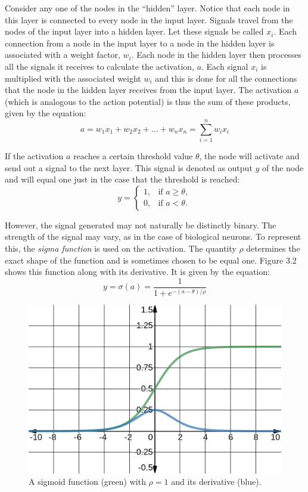 \documentclass[a4paper, 12pt]{report}
\theoremstyle{definition}
\begin{document}
Consider any one of the nodes in the \enquote{hidden} layer. Notice that each node in this layer is connected to every node in the input layer. Signals travel from the nodes of the input layer into a hidden layer. Let these signals be called $x_i$. Each connection from a node in the input layer to a node in the hidden layer is associated with a weight factor, $w_i$. Each node in the hidden layer then processes all the signals it receives to calculate the activation, $a$. Each signal $x_i$ is multiplied with the associated weight $w_i$ and this is done for all the connections that the node in the hidden layer receives from the input layer. The activation $a$ (which is analogous to the action potential) is thus the sum of these products, given by the equation:
\begin{equation}
a = w_1x_1 + w_2x_2 + \dots + w_nx_n = \sum_{i = 1}^n w_ix_i
\end{equation}

If the activation $a$ reaches a certain threshold value $\theta$, the node will activate and send out a signal to the next layer. This signal is denoted as output $y$ of the node and will equal one just in the case that the threshold is reached:
\begin{equation}
y = 
\begin{cases}
  1, & \text{if } a \geq \theta,\\
  0, & \text{if } a < \theta.
\end{cases}
\end{equation}

However, the signal generated may not naturally be distinctly binary. The strength of the signal may vary, as in the case of biological neurons. To represent this, the \textit{sigma function} is used on the activation. The quantity $\rho$ determines the exact shape of the function and is sometimes chosen to be equal one. Figure 3.2 shows this function along with its derivative. It is given by the equation:
\begin{equation}
    y = \sigma(a) = \frac{1}{1+e^{-(a-\theta)/\rho}}
\end{equation}

\begin{figure}[h!]
  \centering
  \includegraphics[width=0.7\linewidth]{im/sigmoid.png}
  \caption{A sigmoid function (green) with $\rho = 1$ and its derivative (blue).}
  \label{fig:NNsig}
\end{figure}
\end{document}
